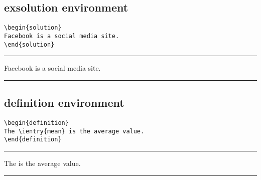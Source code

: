 \documentclass[twocolumn,twoside,11pt]{report}
\begin{document}
\subsection{exsolution environment}

\begin{verbatim}
\begin{solution}
Facebook is a social media site.
\end{solution}
\end{verbatim}

\hrule 
\begin{exsolution}
Facebook is a social media site.
\end{exsolution}

\vspace{3mm}
\hrule

\subsection{definition environment}

\begin{verbatim}
\begin{definition}
The \ientry{mean} is the average value.
\end{definition}
\end{verbatim}

\hrule
\begin{definition}
The  is the average value.
\end{definition}

\vspace{3mm}
\hrule
\end{document}
